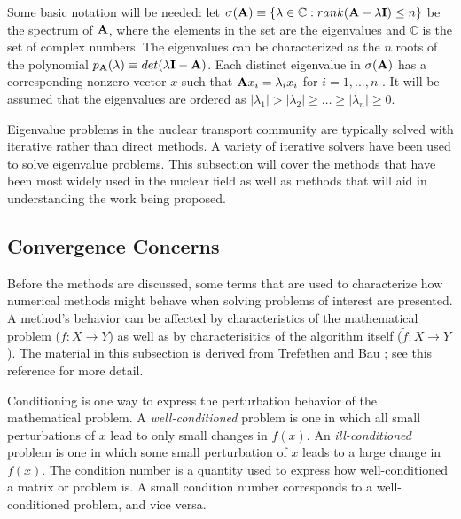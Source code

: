 Some basic notation will be needed: let $\sigma(\mathbf{A}) \equiv \{\lambda \in \mathbb{C} : rank(\mathbf{A} - \lambda \mathbf{I}) \le n\}$ be the spectrum of $\mathbf{A}$, where the elements in the set are the eigenvalues and $\mathbb{C}$ is the set of complex numbers. The eigenvalues can be characterized as the $n$ roots of the polynomial $p_{\mathbf{A}}(\lambda) \equiv det(\lambda \mathbf{I} - \mathbf{A})$. Each distinct eigenvalue in $\sigma(\mathbf{A})$ has a corresponding nonzero vector $x$ such that $\mathbf{A}x_{i} = \lambda_{i} x_{i}$ for $i = 1,...,n$ \cite{Sorensen1996}. It will be assumed that the eigenvalues are ordered as $|\lambda_{1}| > |\lambda_{2}| \ge \dots \ge |\lambda_{n}| \ge 0$. 

Eigenvalue problems in the nuclear transport community are typically solved with iterative rather than direct methods. A variety of iterative solvers have been used to solve eigenvalue problems. This subsection will cover the methods that have been most widely used in the nuclear field as well as methods that will aid in understanding the work being proposed. 

\subsection{Convergence Concerns}
Before the methods are discussed, some terms that are used to characterize how numerical methods might behave when solving problems of interest are presented. A method's behavior can be affected by characteristics of the mathematical problem ($f : X \to Y$) as well as by characterisitics of the algorithm itself ($\tilde f : X \to Y$). The material in this subsection is derived from Trefethen and Bau \cite{Trefethen1997}; see this reference for more detail.

Conditioning is one way to express the perturbation behavior of the mathematical problem. A \emph{well-conditioned} problem is one in which all small perturbations of $x$ lead to only small changes in $f(x)$. An \emph{ill-conditioned} problem is one in which some small perturbation of $x$ leads to a large change in $f(x)$. The condition number is a quantity used to express how well-conditioned a matrix or problem is. A small condition number corresponds to a well-conditioned problem, and vice versa. 

